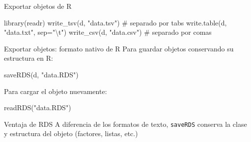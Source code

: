 \documentclass[
  9pt,
  ignorenonframetext,
]{beamer}
\newenvironment{Shaded}{\begin{snugshade}}{\end{snugshade}}
\newcommand{\AttributeTok}[1]{\textcolor[rgb]{0.40,0.45,0.13}{#1}}
\newcommand{\CommentTok}[1]{\textcolor[rgb]{0.37,0.37,0.37}{#1}}
\newcommand{\FunctionTok}[1]{\textcolor[rgb]{0.28,0.35,0.67}{#1}}
\newcommand{\NormalTok}[1]{\textcolor[rgb]{0.00,0.23,0.31}{#1}}
\newcommand{\SpecialCharTok}[1]{\textcolor[rgb]{0.37,0.37,0.37}{#1}}
\newcommand{\StringTok}[1]{\textcolor[rgb]{0.13,0.47,0.30}{#1}}
\begin{document}
\begin{frame}[fragile]{Exportar objetos de R}
\label{exportar-objetos-de-r}
\begin{Shaded}
\begin{Highlighting}[]
\FunctionTok{library}\NormalTok{(readr)}
\FunctionTok{write\_tsv}\NormalTok{(d, }\StringTok{"data.tsv"}\NormalTok{)          }\CommentTok{\# separado por tabs}
\FunctionTok{write.table}\NormalTok{(d, }\StringTok{"data.txt"}\NormalTok{, }\AttributeTok{sep=}\StringTok{"}\SpecialCharTok{\textbackslash{}t}\StringTok{"}\NormalTok{)}
\FunctionTok{write\_csv}\NormalTok{(d, }\StringTok{"data.csv"}\NormalTok{)          }\CommentTok{\# separado por comas}
\end{Highlighting}
\end{Shaded}
\end{frame}

\begin{frame}[fragile]{Exportar objetos: formato nativo de R}
\label{exportar-objetos-formato-nativo-de-r}
Para guardar objetos conservando su estructura en R:

\begin{Shaded}
\begin{Highlighting}[]
\FunctionTok{saveRDS}\NormalTok{(d, }\StringTok{"data.RDS"}\NormalTok{)}
\end{Highlighting}
\end{Shaded}

Para cargar el objeto nuevamente:

\begin{Shaded}
\begin{Highlighting}[]
\FunctionTok{readRDS}\NormalTok{(}\StringTok{"data.RDS"}\NormalTok{)}
\end{Highlighting}
\end{Shaded}

\begin{block}{Ventaja de RDS}
A diferencia de los formatos de texto, \texttt{saveRDS} conserva la clase y estructura del objeto (factores, listas, etc.)
\end{block}
\end{frame}
\end{document}
